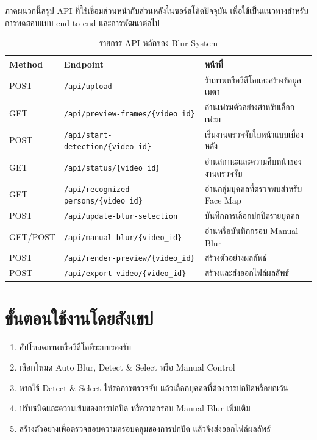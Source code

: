 \setcounter{chapter}{-1}

ภาคผนวกนี้สรุป API ที่ใช้เชื่อมส่วนหน้ากับส่วนหลังในซอร์สโค้ดปัจจุบัน เพื่อใช้เป็นแนวทางสำหรับการทดสอบแบบ end-to-end และการพัฒนาต่อไป

\begin{table}[H]
\centering
\caption{รายการ API หลักของ Blur System}
\label{tab:api-list}
\begin{tabular}{|p{}|p{}|p{}|}
\hline
\textbf{Method} & \textbf{Endpoint} & \textbf{หน้าที่} \\
\hline
POST & \texttt{/api/upload} & รับภาพหรือวิดีโอและสร้างข้อมูลเมตา \\
\hline
GET & \texttt{/api/preview-frames/\{video\_id\}} & อ่านเฟรมตัวอย่างสำหรับเลือกเฟรม \\
\hline
POST & \texttt{/api/start-detection/\{video\_id\}} & เริ่มงานตรวจจับใบหน้าแบบเบื้องหลัง \\
\hline
GET & \texttt{/api/status/\{video\_id\}} & อ่านสถานะและความคืบหน้าของงานตรวจจับ \\
\hline
GET & \texttt{/api/recognized-persons/\{video\_id\}} & อ่านกลุ่มบุคคลที่ตรวจพบสำหรับ Face Map \\
\hline
POST & \texttt{/api/update-blur-selection} & บันทึกการเลือกปกปิดรายบุคคล \\
\hline
GET/POST & \texttt{/api/manual-blur/\{video\_id\}} & อ่านหรือบันทึกกรอบ Manual Blur \\
\hline
POST & \texttt{/api/render-preview/\{video\_id\}} & สร้างตัวอย่างผลลัพธ์ \\
\hline
POST & \texttt{/api/export-video/\{video\_id\}} & สร้างและส่งออกไฟล์ผลลัพธ์ \\
\hline
\end{tabular}
\end{table}

\section*{ขั้นตอนใช้งานโดยสังเขป}

\begin{enumerate}[label=(\arabic*), leftmargin=*]
    \item อัปโหลดภาพหรือวิดีโอที่ระบบรองรับ
    \item เลือกโหมด Auto Blur, Detect \& Select หรือ Manual Control
    \item หากใช้ Detect \& Select ให้รอการตรวจจับ แล้วเลือกบุคคลที่ต้องการปกปิดหรือยกเว้น
    \item ปรับชนิดและความเข้มของการปกปิด หรือวาดกรอบ Manual Blur เพิ่มเติม
    \item สร้างตัวอย่างเพื่อตรวจสอบความครอบคลุมของการปกปิด แล้วจึงส่งออกไฟล์ผลลัพธ์
\end{enumerate}
